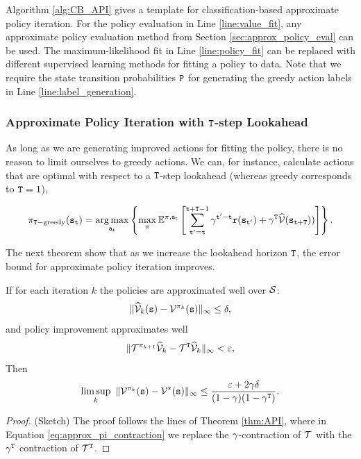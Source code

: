 Algorithm \ref{alg:CB_API} gives a template for classification-based approximate policy iteration. For the policy evaluation in Line \ref{line:value_fit}, any approximate policy evaluation method from Section \ref{sec:approx_policy_eval} can be used. The maximum-likelihood fit in Line \ref{line:policy_fit} can be replaced with different supervised learning methods for fitting a policy to data.
Note that we require the state transition probabilities ${\tt P}$ for generating the greedy action labels in Line \ref{line:label_generation}. 

\subsubsection{Approximate Policy Iteration with ${\tt T}$-step Lookahead}

As long as we are generating improved actions for fitting the policy, there is no reason to limit ourselves to greedy actions. We can, for instance, calculate actions that are optimal with respect to a ${\tt T}$-step lookahead (whereas greedy corresponds to ${\tt T}=1$),

\begin{equation}\label{eq:lookahead_greedy}
    \policy_{\tHorizon-\textrm{greedy}}(\state_\ttime) = \argmax_{\action_\ttime} \left\{\max_{\policy}  \mathbb{E}^{\policy,\action_\ttime} \left[\sum_{\ttime'=\ttime}^{\ttime+\tHorizon-1} \discount^{\ttime' - \ttime}\reward(\state_{\ttime'}) + \discount^\tHorizon \widehat{\Value}(\state_{\ttime+\tHorizon}))\right]\right\}.
\end{equation}

The next theorem show that as we increase the lookahead horizon ${\tt T}$, the error bound for approximate policy iteration improves.

\begin{theorem}\label{thm:lookahead_API}
If for each iteration $k$ the policies are approximated well over $\mathcal{S}$:
\begin{equation}\label{eq:lookahead_approx_pi_1}
\|\widehat{\mathcal{V}}_k({\tt s})-\mathcal{V}^{\pi_k}({\tt s})\|_\infty \le \delta,
\end{equation}
and policy improvement approximates well
\begin{equation}\label{eq:lookahead_approx_pi_2}
\|\mathcal{T}^{\pi_{k+1}}\widehat{\mathcal{V}}_k - \mathcal{T}^{\tt T}\widehat{\mathcal{V}}_k\|_\infty < \varepsilon,
\end{equation}
Then
$$ \limsup_k \ \| \mathcal{V}^{\pi_k}({\tt s})-\mathcal{V}^*({\tt s})\|_\infty \le \frac{\varepsilon+2\gamma\delta}{(1-\gamma)(1-\gamma^{\tt T})}.$$
\end{theorem}
\begin{proof}
    (Sketch) The proof follows the lines of Theorem \ref{thm:API}, where in Equation \ref{eq:approx_pi_contraction} we replace the $\gamma$-contraction of $\mathcal{T}$ with the $\gamma^{\tt T}$ contraction of $\mathcal{T}^{\tt T}$.
\end{proof}

